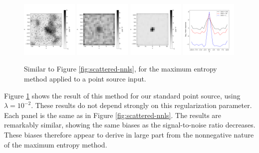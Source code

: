 \documentclass[twocolumn,tighten]{aastex61}
\begin{document}
\begin{figure}[t!]
\centering
\includegraphics[width=0.24\textwidth, angle=0]
                {figures/scattered-mem-noisy.png}
\includegraphics[width=0.24\textwidth, angle=0]
                {figures/scattered-mem-mean-100.png}
\includegraphics[width=0.24\textwidth, angle=0]
                {figures/scattered-mem-mean-1.png}
\includegraphics[width=0.24\textwidth, angle=0]
                {figures/scattered-mem-mean-slice.png}
\caption{ \label{fig:scattered-mem} Similar to Figure
  \ref{fig:scattered-nnls}, for the maximum entropy
  method applied to a point source input.}
\end{figure} 

Figure \ref{fig:scattered-mem} shows the result of this method for
our standard point source, using $\lambda=10^{-2}$. These results do
not depend strongly on this regularization parameter. Each panel is
the same as in Figure \ref{fig:scattered-nnls}. The results are
remarkably similar, showing the same biases as the signal-to-noise
ratio decreases. These biases therefore appear to derive in large part
from the nonnegative nature of the maximum entropy method.
\end{document}
